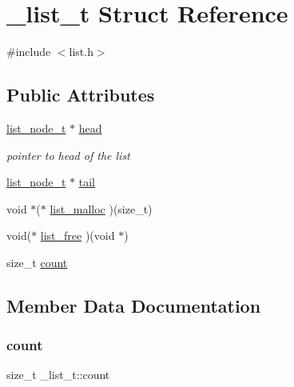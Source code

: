 \hypertarget{struct__list__t}{}\section{\+\_\+list\+\_\+t Struct Reference}
\label{struct__list__t}


{\ttfamily \#include $<$list.\+h$>$}

\subsection*{Public Attributes}
\begin{DoxyCompactItemize}
\item 
\hyperlink{list_8h_ac3a9fd33fd17f716d16148fdb28c2b2c}{list\+\_\+node\+\_\+t} $\ast$ \hyperlink{struct__list__t_a8000fa6452a07fae7cf23ff0b88cd21f}{head}
\begin{DoxyCompactList}\small\item\em pointer to head of the list \end{DoxyCompactList}\item 
\hyperlink{list_8h_ac3a9fd33fd17f716d16148fdb28c2b2c}{list\+\_\+node\+\_\+t} $\ast$ \hyperlink{struct__list__t_a90c071bbb52c78a6f553c7040d92a448}{tail}
\item 
void $\ast$($\ast$ \hyperlink{struct__list__t_a5209da394bf99f322d26b691a2691408}{list\+\_\+malloc} )(size\+\_\+t)
\item 
void($\ast$ \hyperlink{struct__list__t_a71f53c5e245e5e02b92927f390156bc8}{list\+\_\+free} )(void $\ast$)
\item 
size\+\_\+t \hyperlink{struct__list__t_a41c49561b120dcbe9509792f5439a063}{count}
\end{DoxyCompactItemize}


\subsection{Member Data Documentation}
\hypertarget{struct__list__t_a41c49561b120dcbe9509792f5439a063}{}\label{struct__list__t_a41c49561b120dcbe9509792f5439a063} 
\subsubsection{\texorpdfstring{count}{count}}
{\footnotesize\ttfamily size\+\_\+t \+\_\+list\+\_\+t\+::count}

\hypertarget{struct__list__t_a8000fa6452a07fae7cf23ff0b88cd21f}{}\label{struct__list__t_a8000fa6452a07fae7cf23ff0b88cd21f} 
